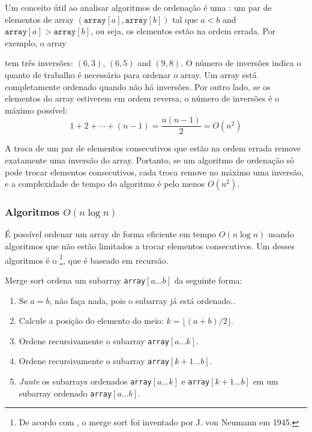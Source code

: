 Um conceito útil ao analisar algoritmos de ordenação é uma :
um par de elementos de array
$(\texttt{array}[a],\texttt{array}[b])$ tal que
$a<b$ and $\texttt{array}[a]>\texttt{array}[b]$,
ou seja, os elementos estão na ordem errada. 
Por exemplo, o array
\begin{center}
\end{center}
tem três inversões: $(6,3)$, $(6,5)$ and $(9,8)$.
O número de inversões indica o quanto de trabalho é necessário para ordenar o array. 
Um array está completamente ordenado quando não há inversões.
Por outro lado, se os elementos do array estiverem em ordem reversa, o número de inversões é o máximo possível:
\[1+2+\cdots+(n-1)=\frac{n(n-1)}{2} = O(n^2)\]

A troca de um par de elementos consecutivos que estão na ordem errada remove exatamente uma inversão do array.
Portanto, se um algoritmo de ordenação só pode trocar elementos consecutivos, cada troca remove no máximo uma inversão, e a complexidade de tempo do algoritmo é pelo menos $O(n^2)$.

\subsubsection{Algoritmos $O(n \log n)$}


É possível ordenar um array de forma eficiente em
tempo $O(n \log n)$ usando algoritmos que não estão limitados a trocar elementos consecutivos.
Um desses algoritmos é o \footnote{De acordo com \cite{knu983},
o merge sort foi inventado por J. von Neumann em 1945.},
que é baseado em recursão.


Merge sort ordena um subarray \texttt{array}$[a \ldots b]$ da seguinte forma:

\begin{enumerate}
\item Se $a=b$, não faça nada, pois o subarray já está ordenado..
\item Calcule a posição do elemento do meio: $k=\lfloor (a+b)/2 \rfloor$.
\item Ordene recursivamente o subarray \texttt{array}$[a \ldots k]$.
\item Ordene recursivamente o subarray \texttt{array}$[k+1 \ldots b]$.
\item \emph{Junte} os subarrays ordenados \texttt{array}$[a \ldots k]$ e
\texttt{array}$[k+1 \ldots b]$
em um subarray ordenado \texttt{array}$[a \ldots b]$.
\end{enumerate}

